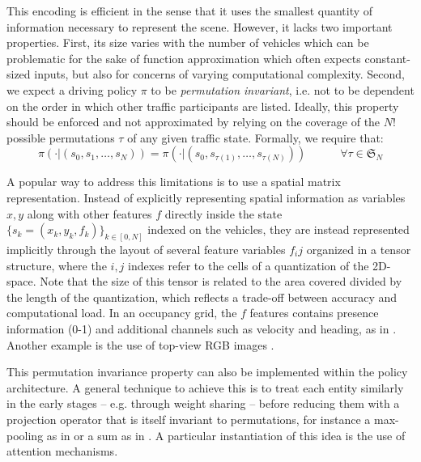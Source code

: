 \documentclass{article}
\begin{document}
{This encoding is efficient in the sense that it uses the smallest quantity of information necessary to represent the scene. However, it lacks two important properties. First, its size varies with the number of vehicles which can be problematic for the sake of function approximation which often expects constant-sized inputs, but also for concerns of varying computational complexity. Second, we expect a driving policy $\pi$ to be \emph{permutation invariant}, i.e. not to be dependent on the order in which other traffic participants are listed. Ideally, this property should be enforced and not approximated by relying on the coverage of the $N!$ possible permutations $\tau$ of any given traffic state. Formally, we require that:
\begin{equation*}
\pi(\cdot|(s_0, s_1,\dotsc,s_N)) = \pi(\cdot|(s_0, s_{\tau(1)},\dotsc,s_{\tau(N)})) \quad\quad\quad \forall\tau \in \mathfrak{S}_N
\end{equation*}

A popular way to address this limitations is to use a spatial matrix representation. Instead of explicitly representing spatial information as variables $x, y$ along with other features $f$ directly inside the state $\{s_k=(x_k,y_k,f_k)\}_{k\in[0,N]}$ indexed on the vehicles, they are instead represented implicitly through the layout of several feature variables $f_ij$ organized in a tensor structure, where the $i,j$ indexes refer to the cells of a quantization of the 2D-space. Note that the size of this tensor is related to the area covered divided by the length of the quantization, which reflects a trade-off between accuracy and computational load.
In an occupancy grid, the $f$ features contains presence information (0-1) and additional channels such as velocity and heading, as in \citep{Isele2017, Fridman2018, Bansal2018, Rehder2017c}. Another example is the use of top-view RGB images \citep{Bagnell2010, Rehder2017, Rehder2017c, Liu2018}.


This permutation invariance property can also be implemented within the policy architecture. A general technique to achieve this is to treat each entity similarly in the early stages -- e.g. through weight sharing -- before reducing them with a projection operator that is itself invariant to permutations, for instance a max-pooling as in \citep{Chen2017} or a sum as in \citep{Qi2016}. A particular instantiation of this idea is the use of attention mechanisms.


}
\end{document}
